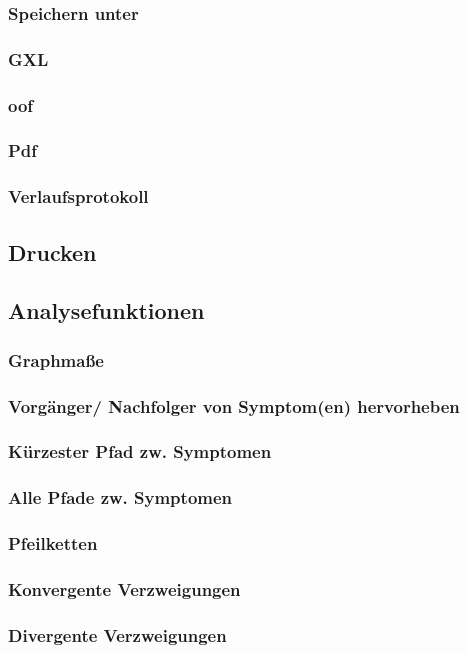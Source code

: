 \documentclass[enabledeprecatedfontcommands,fontsize=11pt,paper=a4,twoside]{scrartcl}
\newcounter{one}
\begin{document}
		\subsubsection{Speichern unter}
		\subsubsection{GXL}
		\subsubsection{oof}
		\subsubsection{Pdf}
		\subsubsection{Verlaufsprotokoll}
	\subsection{Drucken}
	\subsection{Analysefunktionen}
		\subsubsection{Graphmaße}
		\subsubsection{Vorgänger/ Nachfolger von Symptom(en) hervorheben}
		\subsubsection{Kürzester Pfad zw. Symptomen}
		\subsubsection{Alle Pfade zw. Symptomen}
		\subsubsection{Pfeilketten}
		\subsubsection{Konvergente Verzweigungen}
		\subsubsection{Divergente Verzweigungen}
\end{document}
